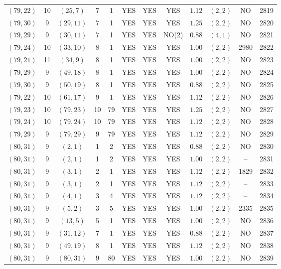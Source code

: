 \begin{longtable}{|c|c|c|c|c|c|c|c|c|c|c|c|}
$(79,22)$ & 10 & $(25,7)$ & 7 & 1 & YES & YES & YES & $1.12$ & $(2,2)$ & NO & 2819\\
$(79,30)$ & 9 & $(29,11)$ & 7 & 1 & YES & YES & YES & $1.25$ & $(2,2)$ & NO & 2820\\
$(79,29)$ & 9 & $(30,11)$ & 7 & 1 & YES & YES & NO(2) & $0.88$ & $(4,1)$ & NO & 2821\\
$(79,24)$ & 10 & $(33,10)$ & 8 & 1 & YES & YES & YES & $1.00$ & $(2,2)$ & 2980 & 2822\\
$(79,21)$ & 11 & $(34,9)$ & 8 & 1 & YES & YES & YES & $1.00$ & $(2,2)$ & NO & 2823\\
$(79,29)$ & 9 & $(49,18)$ & 8 & 1 & YES & YES & YES & $1.00$ & $(2,2)$ & NO & 2824\\
$(79,30)$ & 9 & $(50,19)$ & 8 & 1 & YES & YES & YES & $0.88$ & $(2,2)$ & NO & 2825\\
$(79,22)$ & 10 & $(61,17)$ & 9 & 1 & YES & YES & YES & $1.12$ & $(2,2)$ & NO & 2826\\
$(79,23)$ & 10 & $(79,23)$ & 10 & 79 & YES & YES & YES & $1.25$ & $(2,2)$ & NO & 2827\\
$(79,24)$ & 10 & $(79,24)$ & 10 & 79 & YES & YES & YES & $1.12$ & $(2,2)$ & NO & 2828\\
$(79,29)$ & 9 & $(79,29)$ & 9 & 79 & YES & YES & YES & $1.12$ & $(2,2)$ & NO & 2829\\
$(80,31)$ & 9 & $(2,1)$ & 1 & 2 & YES & YES & YES & $0.88$ & $(2,2)$ & NO & 2830\\
$(80,31)$ & 9 & $(2,1)$ & 1 & 2 & YES & YES & YES & $1.00$ & $(2,2)$ & -- & 2831\\
$(80,31)$ & 9 & $(3,1)$ & 2 & 1 & YES & YES & YES & $1.12$ & $(2,2)$ & 1829 & 2832\\
$(80,31)$ & 9 & $(3,1)$ & 2 & 1 & YES & YES & YES & $1.12$ & $(2,2)$ & -- & 2833\\
$(80,31)$ & 9 & $(4,1)$ & 3 & 4 & YES & YES & YES & $1.12$ & $(2,2)$ & -- & 2834\\
$(80,31)$ & 9 & $(5,2)$ & 3 & 5 & YES & YES & YES & $1.00$ & $(2,2)$ & 2335 & 2835\\
$(80,31)$ & 9 & $(13,5)$ & 5 & 1 & YES & YES & YES & $1.00$ & $(2,2)$ & NO & 2836\\
$(80,31)$ & 9 & $(31,12)$ & 7 & 1 & YES & YES & YES & $0.88$ & $(2,2)$ & NO & 2837\\
$(80,31)$ & 9 & $(49,19)$ & 8 & 1 & YES & YES & YES & $1.12$ & $(2,2)$ & NO & 2838\\
$(80,31)$ & 9 & $(80,31)$ & 9 & 80 & YES & YES & YES & $1.00$ & $(2,2)$ & NO & 2839\\

\end{longtable}
